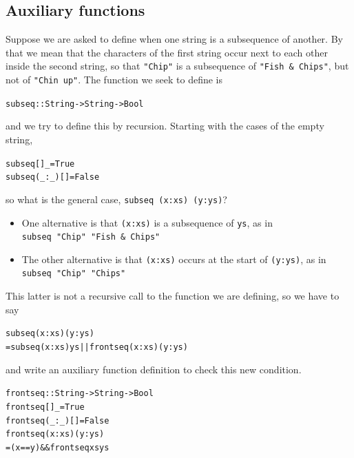 \subsection*{Auxiliary functions}

Suppose we are asked to define when one string is a subsequence of
another. By that we mean that the characters of the first string occur
next to each other inside the second string, so that \texttt{"Chip"} is
a subsequence of \texttt{"Fish \& Chips"}, but not of \texttt{"Chin
up"}. The function we seek to define is
\begin{alltt}
subseq :: String -> String -> Bool
\end{alltt}
and we try to define this by recursion. Starting with the cases of the
empty string,
\begin{alltt}
subseq []    _  = True
subseq (_:_) [] = False
\end{alltt}
so what is the general case, \texttt{subseq (x:xs) (y:ys)}? 
\begin{itemize}
\item One
alternative is that \texttt{(x:xs)}
is a subsequence of \texttt{ys}, as in \\
\texttt{subseq "Chip" "Fish \& Chips"}
\item The other alternative is that \texttt{(x:xs)} occurs at the start of 
\texttt{(y:ys)}, as in\\
\texttt{subseq "Chip" "Chips"}
\end{itemize}
This latter is not a recursive call to the function we are defining, so
we have to say 
\begin{alltt}
subseq (x:xs) (y:ys)
  = subseq (x:xs) ys || frontseq (x:xs) (y:ys)
\end{alltt}
and write an auxiliary function definition to check this new condition.
\begin{alltt}
frontseq :: String -> String -> Bool
frontseq []     _  = True
frontseq (_:_)  [] = False
frontseq (x:xs) (y:ys)
  = (x==y) \&\& frontseq xs ys
\end{alltt}



